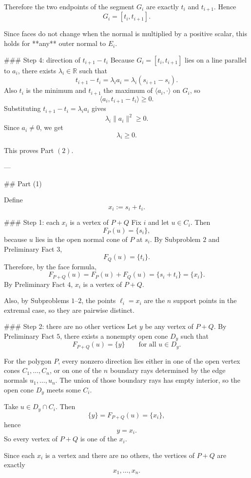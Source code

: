 Therefore the two endpoints of the segment \(G_i\) are exactly \(t_i\) and \(t_{i+1}\). Hence
\[
G_i=[t_i,t_{i+1}].
\]

Since faces do not change when the normal is multiplied by a positive scalar, this holds for **any** outer normal to \(E_i\).

### Step 4: direction of \(t_{i+1}-t_i\)
Because \(G_i=[t_i,t_{i+1}]\) lies on a line parallel to \(a_i\), there exists \(\lambda_i\in\mathbb{R}\) such that
\[
t_{i+1}-t_i=\lambda_i a_i=\lambda_i(s_{i+1}-s_i).
\]
Also \(t_i\) is the minimum and \(t_{i+1}\) the maximum of \(\langle a_i,\cdot\rangle\) on \(G_i\), so
\[
\langle a_i,t_{i+1}-t_i\rangle\ge 0.
\]
Substituting \(t_{i+1}-t_i=\lambda_i a_i\) gives
\[
\lambda_i\|a_i\|^2\ge 0.
\]
Since \(a_i\neq 0\), we get
\[
\lambda_i\ge 0.
\]

This proves Part \((2)\).

---

## Part (1)

Define
\[
x_i:=s_i+t_i.
\]

### Step 1: each \(x_i\) is a vertex of \(P+Q\)
Fix \(i\) and let \(u\in C_i\). Then
\[
F_P(u)=\{s_i\},
\]
because \(u\) lies in the open normal cone of \(P\) at \(s_i\). By Subproblem \(2\) and Preliminary Fact \(3\),
\[
F_Q(u)=\{t_i\}.
\]
Therefore, by the face formula,
\[
F_{P+Q}(u)=F_P(u)+F_Q(u)=\{s_i+t_i\}=\{x_i\}.
\]
By Preliminary Fact \(4\), \(x_i\) is a vertex of \(P+Q\).

Also, by Subproblems \(1\)–\(2\), the points \(\ell_i=x_i\) are the \(n\) support points in the extremal case, so they are pairwise distinct.

### Step 2: there are no other vertices
Let \(y\) be any vertex of \(P+Q\). By Preliminary Fact \(5\), there exists a nonempty open cone \(D_y\) such that
\[
F_{P+Q}(u)=\{y\}
\qquad\text{for all }u\in D_y.
\]

For the polygon \(P\), every nonzero direction lies either in one of the open vertex cones \(C_1,\dots,C_n\), or on one of the \(n\) boundary rays determined by the edge normals \(u_1,\dots,u_n\). The union of those boundary rays has empty interior, so the open cone \(D_y\) meets some \(C_i\).

Take \(u\in D_y\cap C_i\). Then
\[
\{y\}=F_{P+Q}(u)=\{x_i\},
\]
hence
\[
y=x_i.
\]
So every vertex of \(P+Q\) is one of the \(x_i\).

Since each \(x_i\) is a vertex and there are no others, the vertices of \(P+Q\) are exactly
\[
x_1,\dots,x_n.
\]

